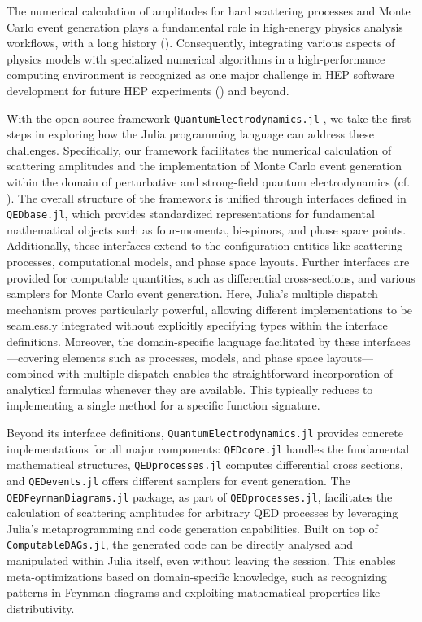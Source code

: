 \documentclass{webofc}
\begin{document}
The numerical calculation of amplitudes for hard scattering processes and Monte
Carlo event generation plays a fundamental role in high-energy physics analysis
workflows, with a long history (\cite{campbell2024event}). Consequently,
integrating various aspects of physics models with specialized numerical
algorithms in a high-performance computing environment is recognized as one
major challenge in HEP software development for future HEP experiments
(\cite{HEPSoftwareFoundation:2017ggl, HSFPhysicsEventGeneratorWG:2020gxw,
HSFPhysicsEventGeneratorWG:2021xti}) and beyond.

With the open-source framework \texttt{QuantumElectrodynamics.jl}
\cite{qedjl-github}, we take the first steps in exploring how the Julia
programming language can address these challenges. Specifically, our framework
facilitates the numerical calculation of scattering amplitudes and the
implementation of Monte Carlo event generation within the domain of perturbative
and strong-field quantum electrodynamics (cf. \cite{Fedotov:2022ely}). The
overall structure of the framework is unified through interfaces defined in
\texttt{QEDbase.jl}, which provides standardized representations for fundamental
mathematical objects such as four-momenta, bi-spinors, and phase space points.
Additionally, these interfaces extend to the configuration entities like
scattering processes, computational models, and phase space layouts. Further
interfaces are provided for computable quantities, such as differential
cross-sections, and various samplers for Monte Carlo event generation. Here,
Julia’s multiple dispatch mechanism proves particularly powerful, allowing
different implementations to be seamlessly integrated without explicitly
specifying types within the interface definitions. Moreover, the domain-specific
language facilitated by these interfaces—covering elements such as processes,
models, and phase space layouts—combined with multiple dispatch enables the
straightforward incorporation of analytical formulas whenever they are
available. This typically reduces to implementing a single method for a specific
function signature.

Beyond its interface definitions, \texttt{QuantumElectrodynamics.jl} provides
concrete implementations for all major components: \texttt{QEDcore.jl} handles
the fundamental mathematical structures, \texttt{QEDprocesses.jl} computes
differential cross sections, and \texttt{QEDevents.jl} offers different samplers
for event generation. The \texttt{QEDFeynmanDiagrams.jl} package, as part of
\texttt{QEDprocesses.jl}, facilitates the calculation of scattering amplitudes
for arbitrary QED processes by leveraging Julia's metaprogramming and code
generation capabilities. Built on top of \texttt{ComputableDAGs.jl}, the
generated code can be directly analysed and manipulated within Julia itself,
even without leaving the session. This enables meta-optimizations based on
domain-specific knowledge, such as recognizing patterns in Feynman diagrams and
exploiting mathematical properties like distributivity.
\end{document}
